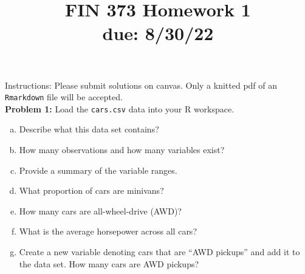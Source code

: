 \documentclass[11pt]{article}
\begin{document}
\title{FIN 373 Homework 1 \\ {\large due: \textbf{8/30/22}}}
\date{}
\maketitle

\vspace{-20mm}

\noindent Instructions: Please submit solutions on canvas.  Only a knitted pdf of an {\tt Rmarkdown} file will be accepted.
\\

\noindent \textbf{Problem 1:} Load the {\tt cars.csv} data into your R workspace.
\begin{enumerate}[a.]
	\item Describe what this data set contains?
	\item How many observations and how many variables exist?
	\item Provide a summary of the variable ranges.
	\item What proportion of cars are minivans?
	\item How many cars are all-wheel-drive (AWD)?
	\item What is the average horsepower across all cars?
	\item Create a new variable denoting cars that are ``AWD pickups'' and add it to the data set.  How many cars are AWD pickups?
\end{enumerate}

\vspace{10mm}

\end{document}
